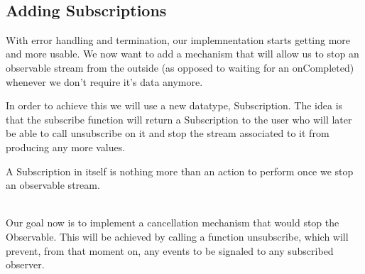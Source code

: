 
\\



\subsection{Adding Subscriptions}
\label{subsec:subsec02}

With error handling and termination, our implemnentation starts getting more and more usable. We now want to add a mechanism that will allow us to stop an observable stream from the outside (as opposed to waiting for an onCompleted) whenever we don't require it's data anymore. 

In order to achieve this we will use a new datatype, Subscription. The idea is that the subscribe function will return a Subscription to the user who will later be able to call unsubscribe on it and stop the stream associated to it from producing any more values.


A Subscription in itself is nothing more than an action to perform once we stop an observable stream.

\\

Our goal now is to implement a cancellation mechanism that would stop the Observable. This will be achieved by calling a function unsubscribe, which will prevent, from that moment on, any events to be signaled to any subscribed observer.

